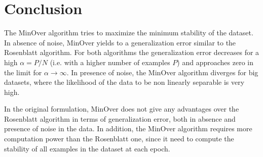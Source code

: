 \section{Conclusion}
\label{sec:conclusion}

The MinOver algorithm tries to maximize the minimum stability of the dataset.
In absence of noise, MinOver yields to a generalization error similar to the Rosenblatt algorithm.
For both algorithms the generalization error decreases for a high $\alpha = P / N$ (i.e. with a higher number of examples $P$) and approaches zero in the limit for $\alpha \to \infty$.
In presence of noise, the MinOver algorithm diverges for big datasets, where the likelihood of the data to be non linearly separable is very high.

In the original formulation, MinOver does not give any advantages over the Rosenblatt algorithm in terms of generalization error, both in absence and presence of noise in the data.
In addition, the MinOver algorithm requires more computation power than the Rosenblatt one, since it need to compute the stability of all examples in the dataset at each epoch.
